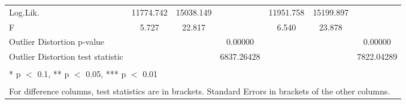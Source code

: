 \begin{table}
\begin{tabular}[t]{lcccccc}
Log.Lik. & 11774.742 & 15038.149 &  & 11951.758 & 15199.897 & \\
F & 5.727 & 22.817 &  & 6.540 & 23.878 & \\
Outlier Distortion p-value &  &  & 0.00000 &  &  & 0.00000\\
Outlier Distortion test statistic &  &  & 6837.26428 &  &  & 7822.04289\\
\bottomrule
\multicolumn{7}{l}{\textsuperscript{} * p $<$ 0.1, ** p $<$ 0.05, *** p $<$ 0.01}\\
\multicolumn{7}{l}{\textsuperscript{} For difference columns, test statistics are in brackets. Standard Errors in brackets of the other columns.}\\
\end{tabular}
\end{table}
